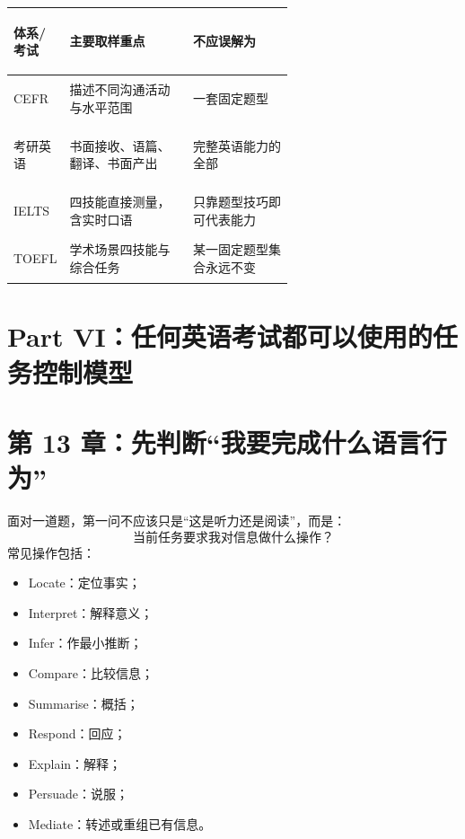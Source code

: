 \documentclass[11pt,a4paper]{ctexart}
\begin{document}
\begin{center}
\small
\begin{tabularx}{\linewidth}{>{\bfseries\raggedright\arraybackslash}p{0.18\linewidth} >{\raggedright\arraybackslash}p{0.44\linewidth} Y}
\toprule
体系/考试 & 主要取样重点 & 不应误解为 \\
\midrule
CEFR & 描述不同沟通活动与水平范围 & 一套固定题型 \\
考研英语 & 书面接收、语篇、翻译、书面产出 & 完整英语能力的全部 \\
IELTS & 四技能直接测量，含实时口语 & 只靠题型技巧即可代表能力 \\
TOEFL & 学术场景四技能与综合任务 & 某一固定题型集合永远不变 \\
\bottomrule
\end{tabularx}
\end{center}

\newpage
\section{Part VI：任何英语考试都可以使用的任务控制模型}

\section{第 13 章：先判断“我要完成什么语言行为”}
面对一道题，第一问不应该只是“这是听力还是阅读”，而是：
\[
\boxed{
\text{当前任务要求我对信息做什么操作？}
}
\]
常见操作包括：
\begin{itemize}
  \item Locate：定位事实；
  \item Interpret：解释意义；
  \item Infer：作最小推断；
  \item Compare：比较信息；
  \item Summarise：概括；
  \item Respond：回应；
  \item Explain：解释；
  \item Persuade：说服；
  \item Mediate：转述或重组已有信息。
\end{itemize}
\end{document}
